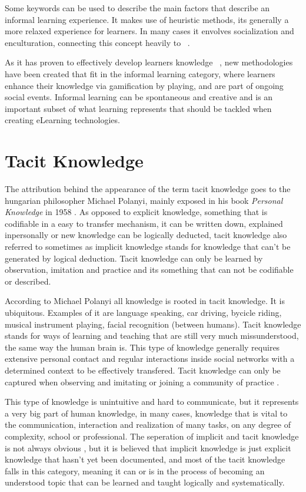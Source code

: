 Some keywords can be used to describe the main factors that describe an informal 
learning experience. It makes use of heuristic methods, its generally a more relaxed
experience for learners. In many cases it envolves socialization and enculturation, 
connecting this concept heavily to ~. 

As it has proven to effectively develop learners knowledge 
~\cite{bridginginschoolandoutofschoollearning}, new methodologies have been created
that fit in the informal learning category, where learners enhance their knowledge
via gamification by playing, and are part of ongoing social events. Informal learning
can be spontaneous and creative and is an important subset of what learning represents
that should be tackled when creating eLearning technologies.




\section{Tacit Knowledge}
\label{section:tacit_knowledge}

The attribution behind the appearance of the term tacit knowledge goes to the 
hungarian philosopher Michael Polanyi, mainly exposed in his book 
\textit{Personal Knowledge} in 1958 \cite{tacitknowledgerevisited}.
As opposed to explicit knowledge, something that is codifiable in a easy to transfer
mechanism, it can be written down, explained inpersonally or new knowledge can be 
logically deducted, tacit knowledge also referred to
sometimes as implicit knowledge stands for knowledge that can't be generated by 
logical deduction. Tacit knowledge can only be learned by observation, imitation and
practice and its something that can not be codifiable or described. \cite{polanyi_1958}

According to Michael Polanyi all knowledge is rooted in tacit knowledge. It is 
ubiquitous. Examples of it are language speaking, car driving, bycicle riding, 
musical instrument playing, facial recognition (between humans). Tacit knowledge 
stands for ways of learning and teaching that are still very much missunderstood, the
same way the human brain is. This type of knowledge generally requires extensive 
personal contact and regular interactions inside social networks with a determined
context to be effectively transfered. Tacit knowledge can only be captured when 
observing and imitating or joining a community of practice \cite{goffin_koners_2011}.

This type of knowledge is unintuitive and hard to communicate, but it represents a 
very big part of human knowledge, in many cases, knowledge that is vital to the 
communication, interaction and realization of many tasks, on any degree of complexity,
school or professional. The seperation of implicit and tacit knowledge is not always
obvious \cite{troublewithtacitknowledge}, but it is believed that implicit knowledge
is just explicit knowledge that hasn't yet been documented, and most of the tacit 
knowledge falls in this category, meaning it can or is in the process of becoming an
understood topic that can be learned and taught logically and systematically.

